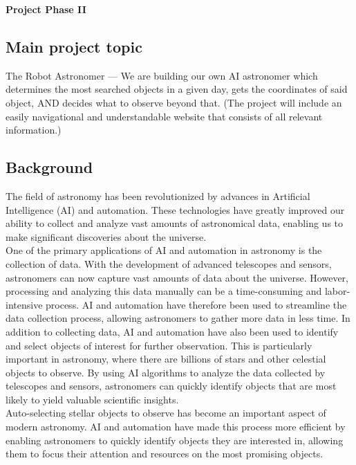 \documentclass[12pt,letterpaper]{article}
\begin{document}
  \thispagestyle{firstpagestyle}
  \begin{center}
    {\huge \textbf{Project Phase II}}
  \end{center}

    
\subsection*{Main project topic}
The Robot Astronomer — We are building our own AI astronomer which determines the most 
searched objects in a given day, gets the coordinates of said object, AND decides what 
to observe beyond that. (The project will include an easily navigational and 
understandable website that consists of all relevant information.)

\subsection*{Background}
The field of astronomy has been revolutionized by advances in Artificial Intelligence 
(AI) and automation. These technologies have greatly improved our ability to collect 
and analyze vast amounts of astronomical data, enabling us to make significant 
discoveries about the universe.\\

One of the primary applications of AI and automation in astronomy is the collection 
of data. With the development of advanced telescopes and sensors, astronomers can now 
capture vast amounts of data about the universe. However, processing and analyzing 
this data manually can be a time-consuming and labor-intensive process. AI and automation 
have therefore been used to streamline the data collection process, allowing astronomers 
to gather more data in less time. In addition to collecting data, AI and automation have 
also been used to identify and select objects of interest for further observation. 
This is particularly important in astronomy, where there are billions of stars and 
other celestial objects to observe. By using AI algorithms to analyze the data collected 
by telescopes and sensors, astronomers can quickly identify objects that are most likely 
to yield valuable scientific insights.\\

Auto-selecting stellar objects to observe has become an important aspect of modern 
astronomy. AI and automation have made this process more efficient by enabling astronomers 
to quickly identify objects they are interested in, allowing them to focus their 
attention and resources on the most promising objects.\\
\end{document}
